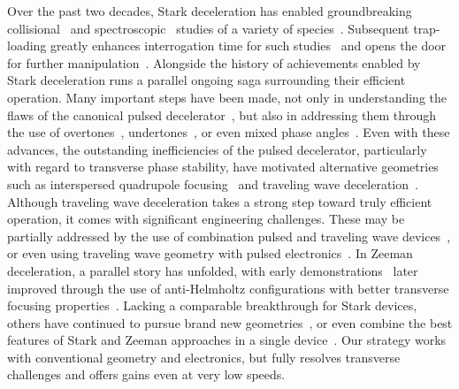 \documentclass[%
 reprint,
 amsmath,amssymb,
 aps,
prl,
]{revtex4-1}
\begin{document}
Over the past two decades, Stark deceleration has enabled groundbreaking collisional~\cite{Sawyer2011,Kirste2012,Gao2018} and spectroscopic~\cite{Veldhoven2004,Hudson2006,Lev2006,Fast2018} studies of a variety of species~\cite{VanDeMeerakker2012}. 
Subsequent trap-loading greatly enhances interrogation time for such studies~\cite{Sawyer2008} and opens the door for further manipulation~\cite{Reens2017}. 
Alongside the history of achievements enabled by Stark deceleration runs a parallel ongoing saga surrounding their efficient operation. 
Many important steps have been made, not only in understanding the flaws of the canonical pulsed decelerator~\cite{VanDeMeerakker2006,Sawyer2008a}, but also in addressing them through the use of overtones~\cite{VanDeMeerakker2005a,Scharfenberg2009}, undertones~\cite{Zhang2016}, or even mixed phase angles~\cite{Parazzoli2009,Hou2013}. 
Even with these advances, the outstanding inefficiencies of the pulsed decelerator, particularly with regard to transverse phase stability, have motivated alternative geometries such as interspersed quadrupole focusing~\cite{Sawyer2008a} and traveling wave deceleration~\cite{Osterwalder2010,VandenBerg2014,Fabrikant2014}.
Although traveling wave deceleration takes a strong step toward truly efficient operation, it comes with significant engineering challenges. 
These may be partially addressed by the use of combination pulsed and traveling wave devices~\cite{Quintero-Perez2013}, or even using traveling wave geometry with pulsed electronics~\cite{Hou2016,Shyur2017}. 
In Zeeman deceleration, a parallel story has unfolded, with early demonstrations~\cite{Vanhaecke2007,Narevicius2008} later improved through the use of anti-Helmholtz configurations with better transverse focusing properties~\cite{LavertOfir2011,Dulitz2014}.
Lacking a comparable breakthrough for Stark devices, others have continued to pursue brand new geometries~\cite{Wang2016}, or even combine the best features of Stark and Zeeman approaches in a single device~\cite{Cremers2017,Plomp2019}.
Our strategy works with conventional geometry and electronics, but fully resolves transverse challenges and offers gains even at very low speeds.
\end{document}
